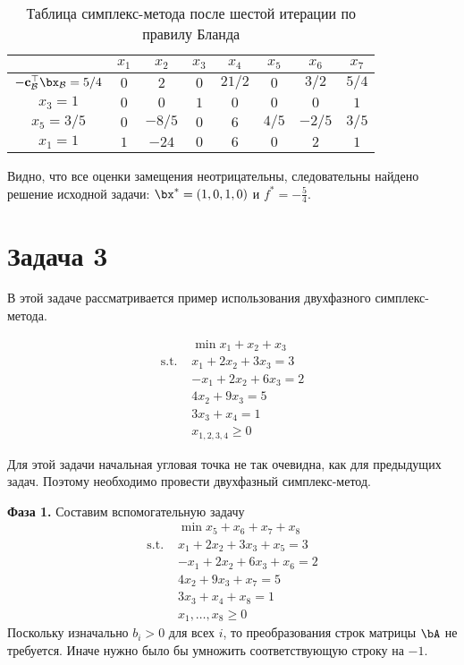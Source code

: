 \documentclass[12pt]{article}
\begin{document}
\begin{table}[!ht]
\centering
\caption{Таблица симплекс-метода после шестой итерации по правилу Бланда}
\begin{tabular}{|c|ccccccc|}
\hline
& $x_1$ & $x_2$ & $x_3$ & $x_4$ & $x_5$ & $x_6$ & $x_7$\\
\hline
$-\mathbf{c}_{\mathcal{B}}^{\top}\bx_{\mathcal{B}} = 5/4$ & $0$ & $2$ & $0$ & $21/2$ & $0$ & $3/2$ & $5/4$ \\
\hline
$x_3 = 1$ & $0$ & $0$ & $1$ & $0$ & $0$ & $0$ & $1$ \\
$x_5 = 3/5$ & $0$ & $-8/5$ & $0$ & $6$ & $4/5$ & $-2/5$ & $3/5$ \\
$x_1 = 1$ & $1$ & $-24$ & $0$ & $6$ & $0$ & $2$ & $1$ \\
\hline
\end{tabular}
\label{tab::simplex_26_2}
\end{table}

Видно, что все оценки замещения неотрицательны, следовательны найдено решение исходной задачи: $\bx^* = (1, 0, 1, 0)$ и $f^* = -\frac{5}{4}$.


\section{Задача 3}
В этой задаче рассматривается пример использования двухфазного симплекс-метода.

\begin{equation*}
\begin{split}
& \min x_1 + x_2 + x_3\\
\text{s.t. } & x_1 + 2x_2 + 3x_3 = 3\\
& -x_1 + 2x_2 + 6x_3 = 2\\
& 4x_2 + 9x_3 = 5\\
& 3x_3 + x_4 = 1\\
& x_{1,2,3,4} \geq 0
\end{split}
\end{equation*}

Для этой задачи начальная угловая точка не так очевидна, как для предыдущих задач. 
Поэтому необходимо провести двухфазный симплекс-метод.
 
\textbf{Фаза 1.} Составим вспомогательную задачу
\begin{equation*}
\begin{split}
& \min x_5 + x_6 + x_7 + x_8\\
\text{s.t. } & x_1 + 2x_2 + 3x_3 + x_5 = 3\\
& -x_1 + 2x_2 + 6x_3 + x_6 = 2\\
& 4x_2 + 9x_3 + x_7 = 5\\
& 3x_3 + x_4 + x_8 = 1\\
& x_1, \dots,x_8 \geq 0
\end{split}
\end{equation*}
Поскольку изначально $b_i > 0$ для всех $i$, то преобразования строк матрицы $\bA$ не требуется. 
Иначе нужно было бы умножить соответствующую строку на $-1$.
\end{document}
